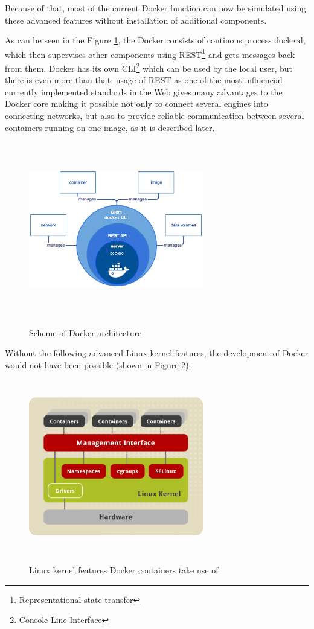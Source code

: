 Because of that, most of the current Docker function can now be simulated
using these advanced features without installation of additional components.

As can be seen in the Figure \ref{fig:DockerArch}, the Docker consists
of continous process dockerd, which then supervises other
components using REST\footnote{Representational state transfer}
and gets messages back from them. Docker has its
own CLI\footnote{Console Line Interface} which can be used by the local
user, but there is even more than that:
usage of REST as one of the most influencial currently implemented
standards in the Web gives many advantages to the Docker core making it possible
not only to connect several engines into connecting networks,
but also to provide reliable communication between several containers running on
one image, as it is described later\cite{DockerArch}.

\begin{figure}
\includegraphics[height=3in, width=3in]{dockerarch}
\caption{Scheme of Docker architecture}
\cite{DockerArch}
\label{fig:DockerArch}
\end{figure}

Without the following advanced Linux kernel features,
the development of Docker would not have been possible
(shown in Figure \ref{fig:DockerLinuxKernelPic}):

\begin{figure}
\includegraphics[height=3in, width=3in]{dockerLinuxKernel}
\caption{Linux kernel features Docker containers take use of}
\cite{DockerLinuxKernelPic}
\label{fig:DockerLinuxKernelPic}
\end{figure}

